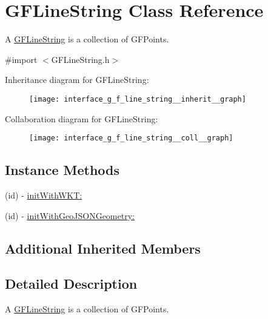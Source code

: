 \hypertarget{interface_g_f_line_string}{}\section{G\+F\+Line\+String Class Reference}
\label{interface_g_f_line_string}


A \hyperlink{interface_g_f_line_string}{G\+F\+Line\+String} is a collection of G\+F\+Points.  




{\ttfamily \#import $<$G\+F\+Line\+String.\+h$>$}



Inheritance diagram for G\+F\+Line\+String\+:\nopagebreak
\begin{figure}[H]
\begin{center}
\leavevmode
\texttt{[image: interface\_g\_f\_line\_string\_\_inherit\_\_graph]}
\end{center}
\end{figure}


Collaboration diagram for G\+F\+Line\+String\+:\nopagebreak
\begin{figure}[H]
\begin{center}
\leavevmode
\texttt{[image: interface\_g\_f\_line\_string\_\_coll\_\_graph]}
\end{center}
\end{figure}
\subsection*{Instance Methods}
\begin{DoxyCompactItemize}
\item 
(id) -\/ \hyperlink{interface_g_f_line_string_ae2adf99cdccb6ee23e22bd8e035d7896}{init\+With\+W\+K\+T\+:}
\item 
(id) -\/ \hyperlink{interface_g_f_line_string_a956fe6e6daf06ca4e016f94d18b2c71f}{init\+With\+Geo\+J\+S\+O\+N\+Geometry\+:}
\end{DoxyCompactItemize}
\subsection*{Additional Inherited Members}


\subsection{Detailed Description}
A \hyperlink{interface_g_f_line_string}{G\+F\+Line\+String} is a collection of G\+F\+Points. 

